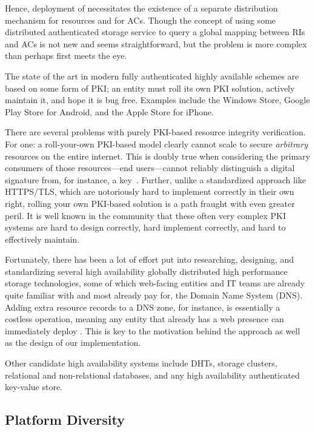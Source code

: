Hence, deployment of \SYSTEM{} necessitates the existence of a separate
distribution mechanism for resources and for ACs. Though the concept of using
some distributed authenticated storage service to query a global mapping between
RIs and ACs is not new and seems straightforward, but the problem is more
complex than perhaps first meets the eye.

The state of the art in modern fully authenticated highly available schemes are
based on some form of PKI; an entity must roll its own PKI solution,
actively maintain it, and hope it is bug free. Examples include the Windows
Store, Google Play Store for Android, and the Apple Store for iPhone.

There are several problems with purely PKI-based resource integrity
verification. For one: a roll-your-own PKI-based model clearly cannot scale to
secure \emph{arbitrary} resources on the entire internet. This is doubly true
when considering the primary consumers of those resources---end users---cannot
reliably distinguish a digital signature from, for instance, a key~\cite{PGPBad,
Tan, Hsiao, Cherubini}. Further, unlike a standardized approach like HTTPS/TLS,
which are notoriously hard to implement correctly in their own right, rolling
your own PKI-based solution is a path fraught with even greater peril. It is
well known in the community that these often very complex PKI systems are hard
to design correctly, hard implement correctly, and hard to effectively maintain.

Fortunately, there has been a lot of effort put into researching, designing, and
standardizing several high availability globally distributed high performance
storage technologies, some of which web-facing entities and IT teams are already
quite familiar with and most already pay for, \eg the Domain Name System (DNS).
Adding extra resource records to a DNS zone, for instance, is essentially a
costless operation, meaning any entity that already has a web presence can
immediately deploy \SYSTEM{}. This is key to the motivation behind the \SYSTEM{}
approach as well as the design of our \DNSSYS{} implementation.

Other candidate high availability systems include DHTs, storage clusters,
relational and non-relational databases, and any high availability authenticated
key-value store.

\subsection{Platform Diversity}

